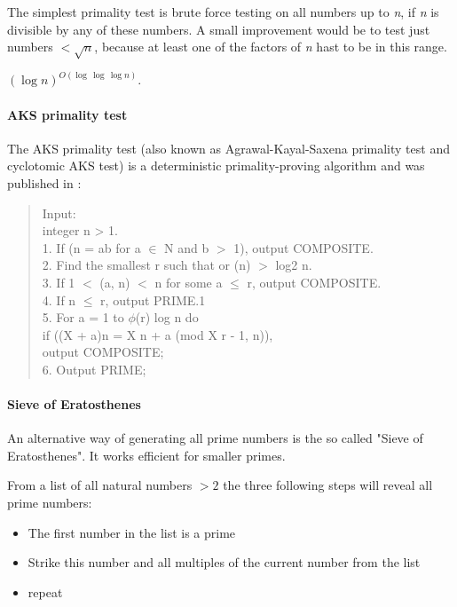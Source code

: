The simplest primality test is brute force testing on all numbers up to \emph{n}, if \emph{n} is divisible by any of these numbers. A small improvement would be to  test just numbers $< \sqrt{n}$, because at least one of the factors of \emph{n} hast to be in this range.

    $(\log n)^{O(\log\,\log \,\log n)}$. 

\paragraph{AKS primality test}
The AKS primality test (also known as Agrawal-Kayal-Saxena primality test and cyclotomic AKS test) is a deterministic primality-proving algorithm and was published in \cite{primeisp}:

\begin{quote}
Input:\\
\noindent\hspace*{12mm} integer n > 1.\\
1. If (n = ab for a $\in$ N and b $>$ 1), output COMPOSITE.\\
2. Find the smallest r such that or (n) $>$ log2 n.\\
3. If 1 $<$ (a, n) $<$ n for some a $\leq$ r, output COMPOSITE.\\
4. If n $\leq$ r, output PRIME.1\\
5. For a = 1 to $\phi$(r) log n do\\
   \noindent\hspace*{12mm} if ((X + a)n = X n + a (mod X r - 1, n)),\\
   \noindent\hspace*{24mm}output COMPOSITE;\\
6. Output PRIME;
\end{quote}

\paragraph{Sieve of Eratosthenes}
An alternative way of generating all prime numbers is the so called "Sieve of Eratosthenes". It works efficient for smaller primes.

From a list of all natural numbers $> 2$ the three following steps will reveal all prime numbers:

\begin{itemize}%
   \item The first number in the list is a prime
   \item Strike this number and all multiples of the current number from the list
   \item repeat  
\end{itemize}%

